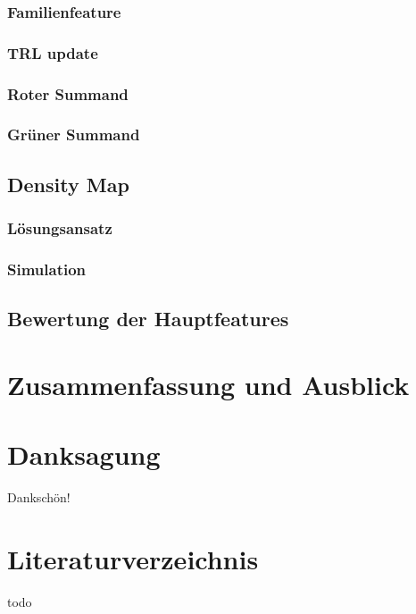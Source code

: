 \documentclass[conference]{IEEEtran}
\begin{document}
\subsubsection{Familienfeature}
\subsubsection{TRL update}
\subsubsection{Roter Summand}
\subsubsection{Grüner Summand}

\subsection{Density Map}
\subsubsection{Lösungsansatz}
\subsubsection{Simulation}

\subsection{Bewertung der Hauptfeatures}

\section{Zusammenfassung und Ausblick}

\section*{Danksagung}

Dankschön!

\section*{Literaturverzeichnis}

\cite{b1}
\begin{thebibliography}{00}
 todo
\end{thebibliography}
\vspace{12pt}
\end{document}
